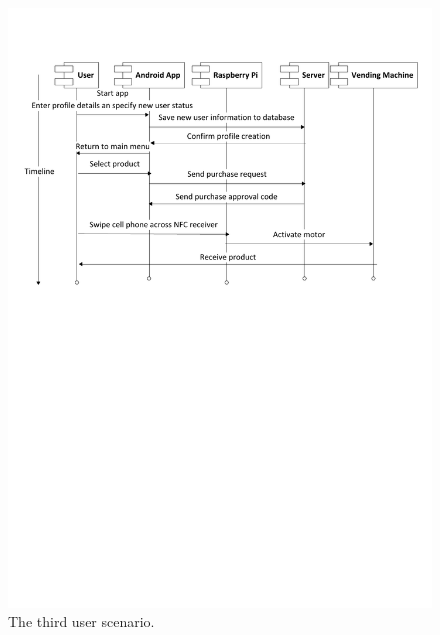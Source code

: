 \begin{figure}
 \centering 
 \includegraphics[clip=true, trim = 0 450 0 70,
 scale=0.7]{user_story_3}
 \caption{The third user scenario.}
 \label{fig:test3}
\end{figure}